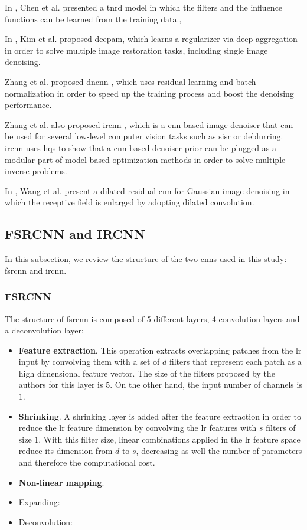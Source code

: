 In \cite{TNRD}, Chen et al. presented a  \gls{tnrd} model in which the filters and the influence functions can be learned from the training data., 

In \cite{DEEPAM}, Kim et al. proposed \gls{deepam}, which learns a regularizer via deep aggregation in order to solve multiple image restoration tasks, including single image denoising.  

Zhang et al. proposed \gls{dncnn} \cite{DNCNN}, which uses residual learning and batch normalization in order to speed up the training process and boost the denoising performance.

Zhang et al. also proposed \gls{ircnn} \cite{IRCNN}, which is a \gls{cnn} based image denoiser that can be used for several low-level computer vision tasks such as \gls{sisr} or deblurring. \gls{ircnn} uses \gls{hqs} to show that a \gls{cnn} based denoiser prior can be plugged as a modular part of model-based optimization methods in order to solve multiple inverse problems.

In \cite{DILATED}, Wang et al. present a dilated residual \gls{cnn} for Gaussian image denoising in which the receptive field is enlarged by adopting dilated convolution.

\subsection{FSRCNN and IRCNN}
In this subsection, we review the structure of the two \glspl{cnn} used in this study: \gls{fsrcnn} and \gls{ircnn}.

\subsubsection{FSRCNN} The structure of \gls{fsrcnn} is composed of 5 different layers, 4 convolution layers and a deconvolution layer:
\begin{itemize}
	\item \textbf{Feature extraction}. This operation extracts overlapping patches from the \gls{lr} input by convolving them with a set of $d$ filters that represent each patch as a high dimensional feature vector. The size of the filters proposed by the authors for this layer is $5$. On the other hand, the input number of channels is $1$.
	\item \textbf{Shrinking}. A shrinking layer is added after the feature extraction in order to reduce the \gls{lr} feature dimension by convolving the \gls{lr} features with $s$ filters of size $1$. With this filter size, linear combinations applied in the  \gls{lr} feature space reduce its dimension from $d$ to $s$, decreasing as well the number of parameters and therefore the computational cost.
	\item \textbf{Non-linear mapping}. 
	\item Expanding:
	\item Deconvolution:
\end{itemize}

